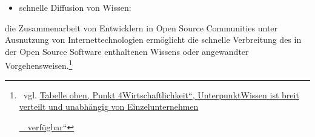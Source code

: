 \documentclass[a4paper]{article}
\newcommand\textstyleInternetlink[1]{\foreignlanguage{english}{\textcolor[rgb]{0.0,0.0,0.5019608}{#1}}}
\newcommand\liststyleWWviiiNumi{%
\renewcommand\theenumi{\arabic{enumi}}
\renewcommand\theenumii{\arabic{enumii}}
\renewcommand\theenumiii{\arabic{enumiii}}
\renewcommand\labelitemi{{}-}
\renewcommand\labelenumi{\theenumi.}
\renewcommand\labelenumii{\theenumii.}
\renewcommand\labelenumiii{\theenumiii.}
}
\begin{document}
\liststyleWWviiiNumi
\begin{itemize}
\item {
{\quotedblbase}schnelle Diffusion von Wissen:}
\end{itemize}
{
die Zusammenarbeit von Entwicklern in Open Source Communities unter
Ausnutzung von Internettechnologien erm\"oglicht die schnelle
Verbreitung des in der Open Source Software enthaltenen Wissens oder
angewandter Vorgehensweisen.\footnote{\ vgl.
\hyperlink{Wissenistbreitverteilt}{\textstyleInternetlink{Tabelle}}\hyperlink{Wissenistbreitverteilt}{\textstyleInternetlink{
}}\hyperlink{Wissenistbreitverteilt}{\textstyleInternetlink{oben,}}\hyperlink{Wissenistbreitverteilt}{\textstyleInternetlink{
}}\hyperlink{Wissenistbreitverteilt}{\textstyleInternetlink{Punkt}}\hyperlink{Wissenistbreitverteilt}{\textstyleInternetlink{
}}\hyperlink{Wissenistbreitverteilt}{\textstyleInternetlink{4}}\hyperlink{Wissenistbreitverteilt}{\textstyleInternetlink{
{\quotedblbase}}}\hyperlink{Wissenistbreitverteilt}{\textstyleInternetlink{Wirtschaftlichkeit}}\hyperlink{Wissenistbreitverteilt}{\textstyleInternetlink{{\textquotedblleft}}}\hyperlink{Wissenistbreitverteilt}{\textstyleInternetlink{,}}\hyperlink{Wissenistbreitverteilt}{\textstyleInternetlink{
}}\hyperlink{Wissenistbreitverteilt}{\textstyleInternetlink{Unterpunkt}}\hyperlink{Wissenistbreitverteilt}{\textstyleInternetlink{
{\quotedblbase}}}\hyperlink{Wissenistbreitverteilt}{\textstyleInternetlink{Wissen}}\hyperlink{Wissenistbreitverteilt}{\textstyleInternetlink{
}}\hyperlink{Wissenistbreitverteilt}{\textstyleInternetlink{ist}}\hyperlink{Wissenistbreitverteilt}{\textstyleInternetlink{
}}\hyperlink{Wissenistbreitverteilt}{\textstyleInternetlink{breit}}\hyperlink{Wissenistbreitverteilt}{\textstyleInternetlink{
}}\hyperlink{Wissenistbreitverteilt}{\textstyleInternetlink{verteilt}}\hyperlink{Wissenistbreitverteilt}{\textstyleInternetlink{
}}\hyperlink{Wissenistbreitverteilt}{\textstyleInternetlink{und}}\hyperlink{Wissenistbreitverteilt}{\textstyleInternetlink{
}}\hyperlink{Wissenistbreitverteilt}{\textstyleInternetlink{unabh\"angig}}\hyperlink{Wissenistbreitverteilt}{\textstyleInternetlink{
}}\hyperlink{Wissenistbreitverteilt}{\textstyleInternetlink{von}}\hyperlink{Wissenistbreitverteilt}{\textstyleInternetlink{
}}\hyperlink{Wissenistbreitverteilt}{\textstyleInternetlink{Einzelunternehmen}}\par
\hyperlink{Wissenistbreitverteilt}{\textstyleInternetlink{\ \ verf\"ugbar}}\hyperlink{Wissenistbreitverteilt}{\textstyleInternetlink{{\textquotedblleft}}}}}
\end{document}
